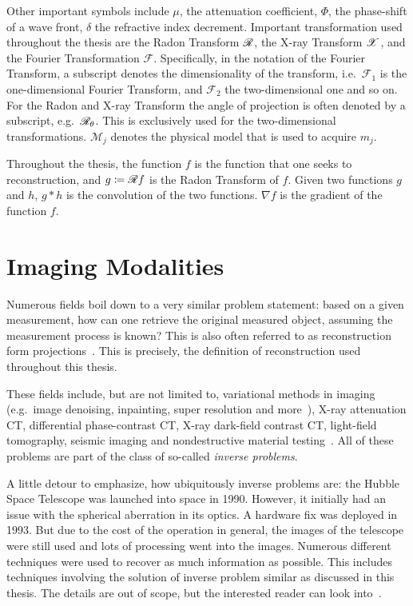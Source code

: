 Other important symbols include \(\mu\), the attenuation coefficient, \(\Phi\), the phase-shift of a
wave front, \(\delta\) the refractive index decrement. Important transformation used throughout
the thesis are the Radon Transform \(\mathscr{R}\), the X-ray Transform \(\mathscr{X}\), and the Fourier
Transformation \(\mathscr{F}\). Specifically, in the notation of the Fourier Transform, a subscript
denotes the dimensionality of the transform, i.e.\ \(\mathscr{F}_1\) is the one-dimensional Fourier
Transform, and \(\mathscr{F}_2\) the two-dimensional one and so on. For the Radon and X-ray
Transform the angle of projection is often denoted by a subscript, e.g.\ \(\mathscr{R}_\theta\). This is
exclusively used for the two-dimensional transformations. \(\mathscr{M}_j\) denotes the physical
model that is used to acquire \(m_j\).

Throughout the thesis, the function \(f\) is the function that one seeks to reconstruction, and
\(g \coloneq \mathscr{R} f\) is the Radon Transform of \(f\). Given two functions \(g\) and \(h\),
\(g \ast h\) is the convolution of the two functions. \(\nabla f\) is the gradient of the
function \(f\).

\chapter{Imaging Modalities}\label{chap:imaging_modalities}

Numerous fields boil down to a very similar problem statement: based on a given measurement, how can
one retrieve the original measured object, assuming the measurement process is known? This is also
often referred to as reconstruction form projections~\cite{herman_basis_2015}. This is precisely,
the definition of reconstruction used throughout this thesis.

These fields include, but are not limited to, variational methods in imaging (e.g.\ image denoising,
inpainting, super resolution and more~\cite{scherzer_variational_2009}), X-ray attenuation CT,
differential phase-contrast CT, X-ray dark-field contrast CT, light-field tomography, seismic
imaging and nondestructive material testing~\cite{carpio_inverse_2008}. All of these problems are
part of the class of so-called \textit{inverse problems}.

A little detour to emphasize, how ubiquitously inverse problems are: the Hubble Space Telescope was
launched into space in 1990. However, it initially had an issue with the spherical aberration in its
optics. A hardware fix was deployed in 1993. But due to the cost of the operation in general, the
images of the telescope were still used and lots of processing went into the images. Numerous
different techniques were used to recover as much information as possible. This includes techniques
involving the solution of inverse problem similar as discussed in this thesis. The details are out
of scope, but the interested reader can look into~\cite{white_restoration_1992,adorf_hubble_1995}.

